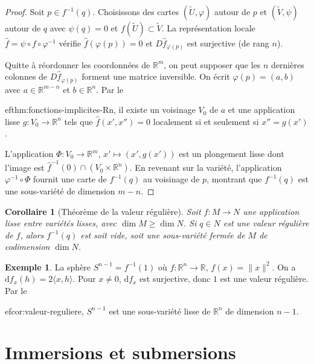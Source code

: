 \documentclass[12pt,a4paper,openany]{book}
\theoremstyle{definition}
\newtheorem{exemple}[definition]{Exemple}
\theoremstyle{plain}
\newtheorem{corollaire}[definition]{Corollaire}
\theoremstyle{remark}
\newcommand{\R}{\mathbb{R}}
\newcommand{\dd}{\mathrm{d}}
\begin{document}
\begin{proof}
Soit $p \in f^{-1}(q)$. Choisissons des cartes $(\tilde{U}, \varphi)$ autour
de $p$ et $(\tilde{V}, \psi)$ autour de $q$ avec $\psi(q) = 0$ et
$f(\tilde{U}) \subset \tilde{V}$. La représentation locale $\hat{f} = \psi
\circ f \circ \varphi^{-1}$ vérifie $\hat{f}(\varphi(p)) = 0$ et $D\hat{f}_{
\varphi(p)}$ est surjective (de rang $n$).

Quitte à réordonner les coordonnées de $\R^m$, on peut supposer que les $n$
dernières colonnes de $D\hat{f}_{\varphi(p)}$ forment une matrice inversible.
On écrit $\varphi(p) = (a, b)$ avec $a \in \R^{m-n}$ et $b \in \R^n$. Par le

ef{thm:fonctions-implicites-Rn}, il existe un voisinage $V_0$ de $a$ et une
application lisse $g \colon V_0 \to \R^n$ tels que $\hat{f}(x', x'') = 0$
localement si et seulement si $x'' = g(x')$.

L'application $\Phi \colon V_0 \to \R^m$, $x' \mapsto (x', g(x'))$ est un
plongement lisse dont l'image est $\hat{f}^{-1}(0) \cap (V_0 \times \R^n)$.
En revenant sur la variété, l'application $\varphi^{-1} \circ \Phi$ fournit
une carte de $f^{-1}(q)$ au voisinage de $p$, montrant que $f^{-1}(q)$ est
une sous-variété de dimension $m - n$.
\end{proof}

\begin{corollaire}[Théorème de la valeur régulière]\label{cor:valeur-reguliere}
Soit $f \colon M \to N$ une application lisse entre variétés lisses, avec
$\dim M \geq \dim N$. Si $q \in N$ est une valeur régulière de $f$, alors
$f^{-1}(q)$ est soit vide, soit une sous-variété fermée de $M$ de codimension
$\dim N$.
\end{corollaire}

\begin{exemple}\label{ex:sphere-valeur-reguliere}
La sphère $S^{n-1} = f^{-1}(1)$ où $f \colon \R^n \to \R$, $f(x) = \|x\|^2$.
On a $\dd f_x(h) = 2\langle x, h \rangle$. Pour $x \neq 0$, $\dd f_x$ est
surjective, donc $1$ est une valeur régulière. Par le

ef{cor:valeur-reguliere}, $S^{n-1}$ est une sous-variété lisse de $\R^n$
de dimension $n - 1$.
\end{exemple}


\section{Immersions et submersions}
\label{sec:immersions-submersions}
\end{document}
